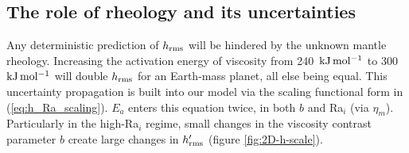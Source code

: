\documentclass[trackchanges]{aastex63}
\begin{document}
\subsection{The role of rheology and its uncertainties} \label{sec:discussion-rheology}



Any deterministic prediction of $h_{\rm rms}$ will be hindered by the unknown mantle rheology. Increasing the activation energy of viscosity from 240~$\rm{kJ\,mol^{-1}}$ to 300~$\rm{kJ\,mol^{-1}}$ will double $h_{\rm rms}$ for an Earth-mass planet, all else being equal. This uncertainty propagation is built into our model via the scaling functional form in (\ref{eq:h_Ra_scaling}). $E_a$ enters this equation twice, in both $b$ and Ra$_i$ (via $\eta_m$). Particularly in the high-Ra$_i$ regime, small changes in the viscosity contrast parameter $b$ create large changes in $h_{\rm rms}^\prime$ (figure \ref{fig:2D-h-scale}). 
\end{document}
